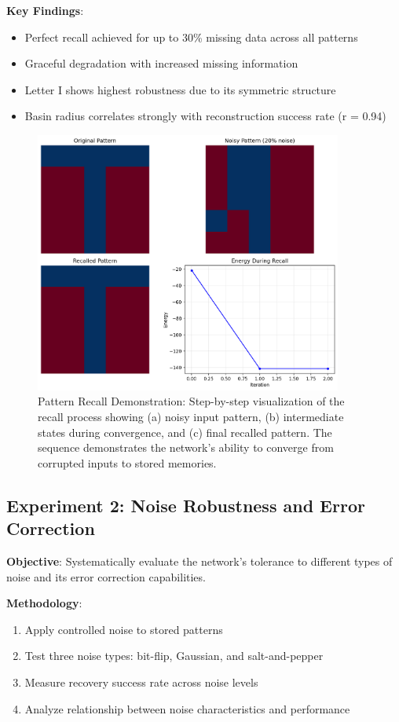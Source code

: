 \documentclass[11pt,a4paper]{article}
\begin{document}
\textbf{Key Findings}:
\begin{itemize}
    \item Perfect recall achieved for up to 30\% missing data across all patterns
    \item Graceful degradation with increased missing information
    \item Letter I shows highest robustness due to its symmetric structure
    \item Basin radius correlates strongly with reconstruction success rate (r = 0.94)
\end{itemize}

\begin{figure}[H]
\centering
\includegraphics[width=0.9\textwidth]{recall_demo.png}
\caption{Pattern Recall Demonstration: Step-by-step visualization of the recall process showing (a) noisy input pattern, (b) intermediate states during convergence, and (c) final recalled pattern. The sequence demonstrates the network's ability to converge from corrupted inputs to stored memories.}
\label{fig:recall_demo}
\end{figure}

\subsection{Experiment 2: Noise Robustness and Error Correction}

\textbf{Objective}: Systematically evaluate the network's tolerance to different types of noise and its error correction capabilities.

\textbf{Methodology}:
\begin{enumerate}
    \item Apply controlled noise to stored patterns
    \item Test three noise types: bit-flip, Gaussian, and salt-and-pepper
    \item Measure recovery success rate across noise levels
    \item Analyze relationship between noise characteristics and performance
\end{enumerate}
\end{document}
